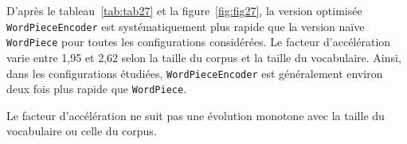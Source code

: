 \documentclass[12pt,a4paper]{report}
\begin{document}
D’après le tableau~\ref{tab:tab27} et la figure~\ref{fig:fig27}, la version optimisée \texttt{WordPieceEncoder} est systématiquement plus rapide que la version naïve \texttt{WordPiece} pour toutes les configurations considérées. Le facteur d’accélération varie entre 1,95 et 2,62 selon la taille du corpus et la taille du vocabulaire. Ainsi, dans les configurations étudiées, \texttt{WordPieceEncoder} est généralement environ deux fois plus rapide que \texttt{WordPiece}.

Le facteur d’accélération ne suit pas une évolution monotone avec la taille du vocabulaire ou celle du corpus.

\begin{table}[h]
	\centering
	
	\caption{Facteur d'accélération de \texttt{WordPieceEncoder} par rapport à \texttt{WordPiece}.}
	\label{tab:tab27}
\end{table}
\FloatBarrier
\end{document}
